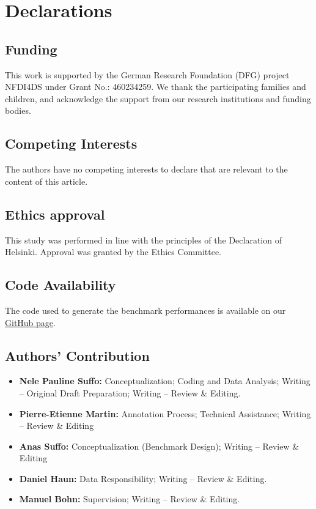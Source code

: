 \documentclass[
  man,floatsintext]{apa6}
\providecommand{\tightlist}{%
  \setlength{\itemsep}{0pt}\setlength{\parskip}{0pt}}
\begin{document}
\newpage

\section{Declarations}\label{declarations}

\subsection{Funding}\label{funding}

This work is supported by the German Research Foundation (DFG) project NFDI4DS under Grant No.: 460234259. We thank the participating families and children, and acknowledge the support from our research institutions and funding bodies.

\subsection{Competing Interests}\label{competing-interests}

The authors have no competing interests to declare that are relevant to the content of this article.

\subsection{Ethics approval}\label{ethics-approval}

This study was performed in line with the principles of the Declaration of Helsinki. Approval was granted by the Ethics Committee.

\subsection{Code Availability}\label{code-availability}

The code used to generate the benchmark performances is available on our \href{https://github.com/neleSuffo/ChildLens}{GitHub page}.

\subsection{Authors' Contribution}\label{authors-contribution}

\begin{itemize}
\tightlist
\item
  \textbf{Nele Pauline Suffo:} Conceptualization; Coding and Data Analysis; Writing -- Original Draft Preparation; Writing -- Review \& Editing.
\item
  \textbf{Pierre-Etienne Martin:} Annotation Process; Technical Assistance; Writing -- Review \& Editing
\item
  \textbf{Anas Suffo:} Conceptualization (Benchmark Design); Writing -- Review \& Editing
\item
  \textbf{Daniel Haun:} Data Responsibility; Writing -- Review \& Editing.
\item
  \textbf{Manuel Bohn:} Supervision; Writing -- Review \& Editing.
\end{itemize}
\end{document}
